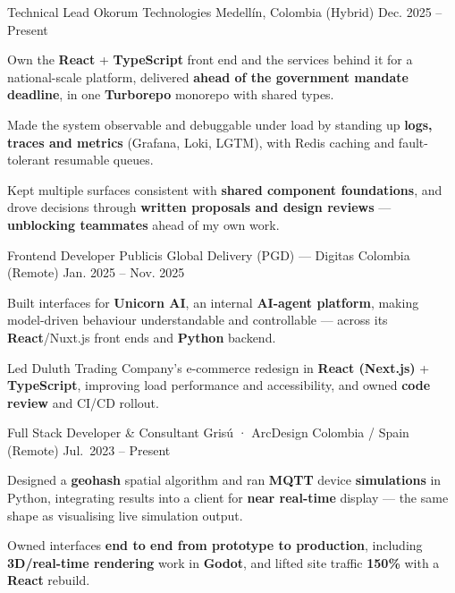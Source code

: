 \newcommand{\quotes}[1]{``#1''}

\begin{cventries}

  \cventry
  {Technical Lead}
  {Okorum Technologies}
  {Medellín, Colombia (Hybrid)}
  {Dec. 2025 -- Present}
  {
    \begin{cvitems}
      \item {Own the \textbf{React} + \textbf{TypeScript} front end and the services behind it for a national-scale platform, delivered \textbf{ahead of the government mandate deadline}, in one \textbf{Turborepo} monorepo with shared types.}
      \item {Made the system observable and debuggable under load by standing up \textbf{logs, traces and metrics} (Grafana, Loki, LGTM), with Redis caching and fault-tolerant resumable queues.}
      \item {Kept multiple surfaces consistent with \textbf{shared component foundations}, and drove decisions through \textbf{written proposals and design reviews} --- \textbf{unblocking teammates} ahead of my own work.}
    \end{cvitems}
  }

  \cventry
  {Frontend Developer}
  {Publicis Global Delivery (PGD) — Digitas}
  {Colombia (Remote)}
  {Jan. 2025 -- Nov. 2025}
  {
    \begin{cvitems}
      \item {Built interfaces for \textbf{Unicorn AI}, an internal \textbf{AI-agent platform}, making model-driven behaviour understandable and controllable --- across its \textbf{React}/Nuxt.js front ends and \textbf{Python} backend.}
      \item {Led Duluth Trading Company's e-commerce redesign in \textbf{React (Next.js)} + \textbf{TypeScript}, improving load performance and accessibility, and owned \textbf{code review} and CI/CD rollout.}
    \end{cvitems}
  }

  \cventry
  {Full Stack Developer \& Consultant}
  {Grisú · ArcDesign}
  {Colombia / Spain (Remote)}
  {Jul.\ 2023 -- Present}
  {
    \begin{cvitems}
      \item {Designed a \textbf{geohash} spatial algorithm and ran \textbf{MQTT} device \textbf{simulations} in Python, integrating results into a client for \textbf{near real-time} display --- the same shape as visualising live simulation output.}
      \item {Owned interfaces \textbf{end to end from prototype to production}, including \textbf{3D/real-time rendering} work in \textbf{Godot}, and lifted site traffic \textbf{150\%} with a \textbf{React} rebuild.}
    \end{cvitems}
  }


\end{cventries}
